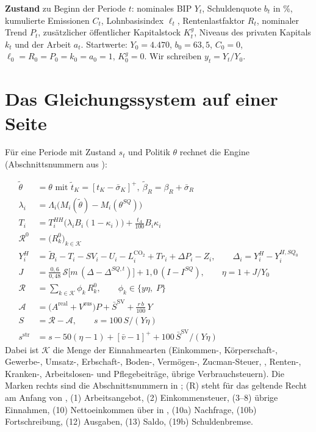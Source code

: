 \textbf{Zustand} zu Beginn der Periode $t$: nominales BIP $Y_t$, Schuldenquote $b_t$ in \%,
kumulierte Emissionen $C_t$, Lohnbasisindex $\ell_t$, Rentenlastfaktor $R_t$, nominaler Trend
$P_t$, zusätzlicher öffentlicher Kapitalstock $K^g_t$, Niveaus des privaten Kapitals $k_t$ und
der Arbeit $a_t$. Startwerte: $Y_0=4.470$, $b_0=63{,}5$, $C_0=0$, $\ell_0=R_0=P_0=k_0=a_0=1$,
$K^g_0=0$. Wir schreiben $y_t=Y_t/Y_0$.

\section{Das Gleichungssystem auf einer Seite}
\label{sec:ueberblick}

Für eine Periode mit Zustand $s_t$ und Politik $\theta$ rechnet die Engine (Abschnittsnummern
aus ):

\begin{align}
\tilde\theta &= \theta \text{ mit } \tilde t_K=[t_K-\bar\sigma_K]^+,\ \tilde\beta_R=\beta_R+\bar\sigma_R
  \tag{R}\\
\lambda_i &= \Lambda_i\bigl(M_i(\tilde\theta)-M_i(\theta^{SQ})\bigr)
  \tag{1}\\
T_i &= T^{HH}_i\bigl(\lambda_iB_i(1-\kappa_i)\bigr) + \tfrac{t_A}{100}B_i\kappa_i
  \tag{2}\\
\mathcal{R}^0 &= \bigl(R^0_k\bigr)_{k\in\mathcal K}
  \tag{3--8}\\
Y^H_i &= \tilde B_i - T_i - SV_i - U_i - L^{\text{CO}_2}_i + \mathit{Tr}_i + \Delta P_i - Z_i,
  \qquad \Delta_i = Y^H_i - Y^{H,SQ_0}_i
  \tag{10}\\
J &= \tfrac{0{,}6}{0{,}48}\,\mathcal{S}\bigl[m\,(\Delta-\Delta^{SQ,t})\bigr] + 1{,}0\,(I-I^{SQ}),\qquad
  \eta = 1+J/Y_0
  \tag{10a}\\
\mathcal{R} &= \textstyle\sum_{k\in\mathcal K} \phi_k\,R^0_k,\qquad \phi_k\in\{y\eta,\;P\}
  \tag{10b}\\
\mathcal{A} &= \bigl(A^{\text{real}}+V^{\text{zus}}\bigr)P + \bar S^{\text{SV}} + \tfrac{r\,b}{100}\,Y
  \tag{12}\\
S &= \mathcal{R}-\mathcal{A},\qquad s = 100\,S/(Y\eta)
  \tag{13}\\
s^{\text{str}} &= s - 50(\eta-1) + [\bar v-1]^+ + 100\,\bar S^{\text{SV}}/(Y\eta)
  \tag{19b}
\end{align}
Dabei ist $\mathcal K$ die Menge der Einnahmearten (Einkommen-, Körperschaft-, Gewerbe-,
Umsatz-, Erbschaft-, Boden-, Vermögen-, Zucman-Steuer, \COz, Renten-, Kranken-,
Arbeitslosen- und Pflegebeiträge, übrige Verbrauchsteuern). Die Marken rechts sind die
Abschnittsnummern in ; (R) steht für das geltende Recht am Anfang von , (1) Arbeitsangebot,
(2) Einkommensteuer, (3--8) übrige Einnahmen, (10) Nettoeinkommen über
 in , (10a) Nachfrage,
(10b) Fortschreibung, (12) Ausgaben, (13) Saldo, (19b) Schuldenbremse.

